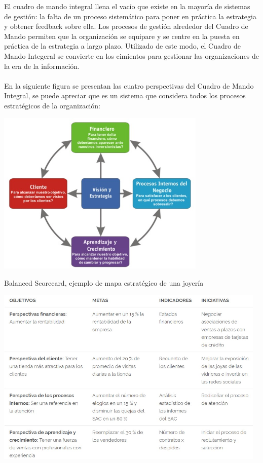 \documentclass[preprint,12pt]{elsarticle}
\begin{document}
El cuadro de mando integral llena el vacío que existe en la mayoría de sistemas de gestión: la falta de un proceso sistemático para poner en práctica la estrategia y obtener feedback sobre ella. Los procesos de gestión alrededor del Cuadro de Mando permiten que la organización se equipare y se centre en la puesta en práctica de la estrategia a largo plazo. Utilizado de este modo, el Cuadro de Mando Integeral se convierte en los cimientos para gestionar las organizaciones de la era de la información.\\
\\
En la siguiente figura se presentan las cuatro perspectivas del Cuadro de Mando Integral, se puede apreciar que es un sistema que considera todos los procesos estratégicos de la organización:

\begin{center}
	\includegraphics[width=10cm]{./Imagenes/img2} 
\end{center}

Balanced Scorecard, ejemplo de mapa estratégico de una joyería

\begin{center}
	\includegraphics[width=13cm]{./Imagenes/img3} 
\end{center}
\end{document}
